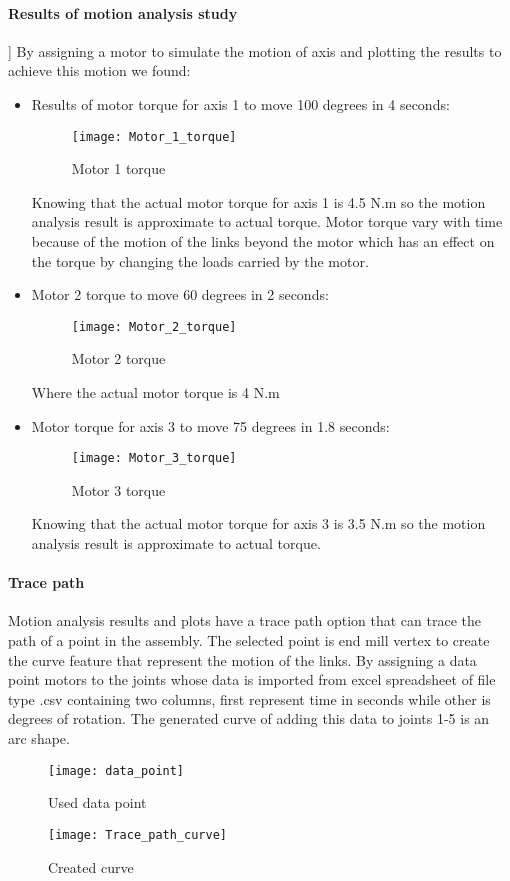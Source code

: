 \documentclass{book}
\begin{document}
\paragraph{Results of motion analysis study}] 
By assigning a motor to simulate the motion of axis and plotting the results to achieve this motion we found:
\begin{itemize}
	\item Results of motor torque for axis 1 to move 100 degrees in 4 seconds:
	\begin{figure}[h]
		
		\caption{Motor 1 torque}
		\centering
		\texttt{[image: Motor\_1\_torque]}
	\end{figure}

Knowing that the actual motor torque for axis 1 is 4.5 N.m so the motion analysis result is approximate to actual torque. 
\newline Motor torque vary with time because of the motion of the links beyond the motor which has an effect on the torque by changing the loads carried by the motor.
\item Motor 2 torque to move 60 degrees in 2 seconds:
\begin{figure}[h]
	
	\caption{Motor 2 torque}
	\centering
	\texttt{[image: Motor\_2\_torque]}
\end{figure}

 Where the actual motor torque is 4 N.m
 \newpage
\item Motor torque for axis 3 to move 75 degrees in 1.8 seconds:
\begin{figure}[h]
	
	\caption{Motor 3 torque}
	\centering
	\texttt{[image: Motor\_3\_torque]}
\end{figure}

 Knowing that the actual motor torque for axis 3 is 3.5 N.m so the motion analysis result is approximate to actual torque.
\end{itemize}
\newpage
\paragraph{Trace path}
Motion analysis results and plots have a trace path option that can trace the path of a point in the assembly. The selected point is end mill vertex to create the curve feature that represent the motion of the links.  By assigning a data point motors to the joints whose data is imported from excel spreadsheet of file type .csv containing two columns, first represent time in seconds while other is degrees of rotation. The generated curve of adding this data to joints 1-5 is an arc shape.
\begin{figure}[h]
	
	\caption{Used data point}
	\centering
	\texttt{[image: data\_point]}
\end{figure}
\begin{figure}[h]
	
	\caption{Created curve}
	\centering
	\texttt{[image: Trace\_path\_curve]}
\end{figure}
\newpage
\end{document}
